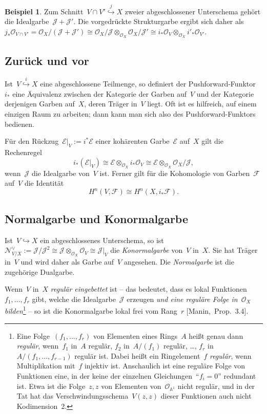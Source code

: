 \documentclass[a4paper,ngerman,12pt]{scrartcl}
\theoremstyle{definition}
\newtheorem{ex}[defn]{Beispiel}
\theoremstyle{plain}
\theoremstyle{remark}
\renewcommand{\AA}{\mathbb{A}}
\newcommand{\E}{\mathcal{E}}
\newcommand{\F}{\mathcal{F}}
\newcommand{\N}{\mathcal{N}}
\newcommand{\J}{\mathcal{J}}
\renewcommand{\O}{\mathcal{O}}
\begin{document}
\begin{ex}Zum Schnitt~$V \cap V' \stackrel{j}{\hookrightarrow} X$ zweier
abgeschlossener Unterschema gehört die Idealgarbe~$\J + \J'$. Die vorgedrückte
Strukturgarbe ergibt sich daher als~$j_*\O_{V \cap V'} = \O_X/(\J + \J') \cong
\O_X/\J \otimes_{\O_X} \O_X/\J' \cong i_*\O_V \otimes_{\O_X}
i'_*\O_{V'}$.\end{ex}


\subsection*{Zurück und vor}

Ist~$V \stackrel{i}{\hookrightarrow} X$ eine abgeschlossene Teilmenge, so
definiert der Pushforward-Funktor~$i_*$ eine Äquivalenz zwischen der Kategorie
der Garben auf~$V$ und der Kategorie derjenigen Garben auf~$X$, deren Träger
in~$V$ liegt. Oft ist es hilfreich, auf einem einzigen Raum zu arbeiten; dann
kann man sich also des Pushforward-Funktors bedienen.

Für den Rückzug~$\E|_V := i^* \E$ einer kohärenten Garbe~$\E$ auf~$X$ gilt die
Rechenregel
\[ i_* (\E|_V) \cong \E \otimes_{\O_X} i_*\O_V \cong \E \otimes_{\O_X} \O_X/\J,
\]
wenn~$\J$ die Idealgarbe von~$V$ ist. Ferner gilt für die Kohomologie von
Garben~$\F$ auf~$V$ die Identität
\[ H^n(V, \F) \cong H^n(X, i_*\F). \]


\subsection*{Normalgarbe und Konormalgarbe}

Ist~$V \hookrightarrow X$ ein abgeschlossenes Unterschema, so ist~$\N_{V/X}^\vee
:= \J/\J^2 \cong \J \otimes_{\O_X} \O_V \cong \J|_V$ die \emph{Konormalgarbe} von~$V$ in~$X$. Sie hat Träger in~$V$ und
wird daher als Garbe auf~$V$ angesehen. Die \emph{Normalgarbe} ist die
zugehörige Dualgarbe.

Wenn~$V$ in~$X$ \emph{regulär eingebettet} ist -- das bedeutet, dass es lokal
Funktionen~$f_1,\ldots,f_r$ gibt, welche die Idealgarbe~$\J$ erzeugen \emph{und
eine reguläre Folge in~$\O_X$ bilden}\footnote{\label{fn:regulaere-folge}Eine Folge~$(f_1,\ldots,f_r)$
von Elementen eines Rings~$A$ heißt genau dann \emph{regulär}, wenn~$f_1$
in~$A$ regulär, $f_2$ in~$A/(f_1)$ regulär, \ldots, $f_r$
in~$A/(f_1,\ldots,f_{r-1})$ regulär ist. Dabei heißt ein Ringelement~$f$
\emph{regulär}, wenn Multiplikation mit~$f$ injektiv ist. Anschaulich ist eine
reguläre Folge von Funktionen eine, in der keine der einzelnen Gleichungen~"`$f_i = 0$"'
redundant ist. Etwa ist die Folge~$z, z$ von Elementen von~$\O_{\AA^1}$ nicht
regulär, und in der Tat hat das Verschwindungsschema~$V(z,z)$ dieser Funktionen
auch nicht Kodimension~2.} -- so ist die Konormalgarbe lokal frei
vom Rang~$r$ [Manin,~Prop.~3.4].
\end{document}
